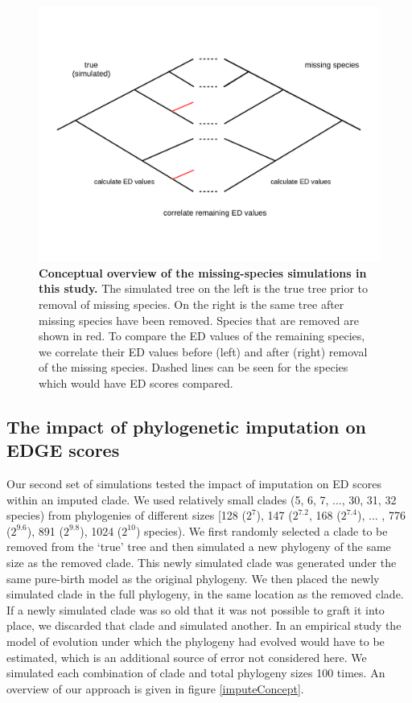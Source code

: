\documentclass[10pt,english]{article}
\begin{document}
\begin{figure}[!ht]
  \center
  \includegraphics[width=.75\textwidth]{missingSpecies.png}
  \caption{\textbf{Conceptual overview of the missing-species simulations in
  this study.} The simulated tree on the left is the true tree prior to removal
  of missing species. On the right is the same tree after missing species have
  been removed. Species that are removed are shown in red. To compare the ED
  values of the remaining species, we correlate their ED values before (left)
  and after (right) removal of the missing species. Dashed lines can be seen for
  the species which would have ED scores compared.}
  \label{missingSpecies}
\end{figure}

\subsection*{The impact of phylogenetic imputation on EDGE scores}
Our second set of simulations tested the impact of imputation on ED scores
within an imputed clade. We used relatively small clades (5, 6, 7, ..., 30, 31,
32 species) from phylogenies of different sizes [128 ($2^7$), 147 ($2^{7.2}$,
168 ($2^{7.4}$), ... , 776 ($2^{9.6}$), 891 ($2^{9.8}$), 1024 ($2^{10}$)
species). We first randomly selected a clade to be removed from the ‘true' tree
and then simulated a new phylogeny of the same size as the removed clade. This
newly simulated clade was generated under the same pure-birth model as the
original phylogeny. We then placed the newly simulated clade in the full
phylogeny, in the same location as the removed clade. If a newly simulated clade
was so old that it was not possible to graft it into place, we discarded that
clade and simulated another. In an empirical study the model of evolution under
which the phylogeny had evolved would have to be estimated, which is an
additional source of error not considered here. We simulated each combination of
clade and total phylogeny sizes 100 times. An overview of our approach is given
in figure \ref{imputeConcept}. 
\end{document}
